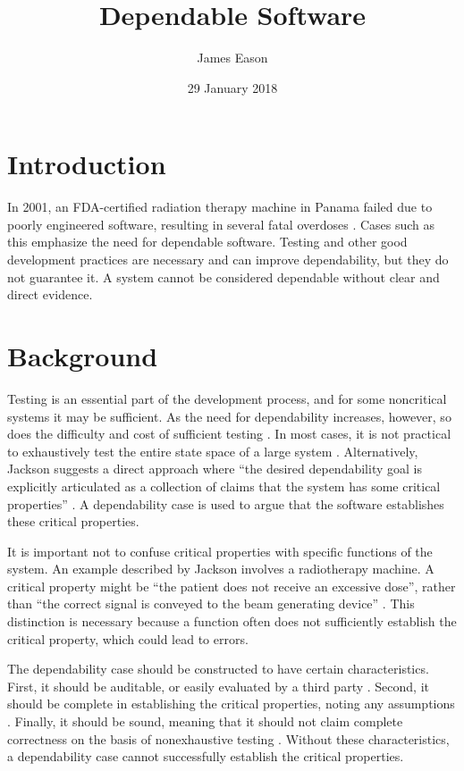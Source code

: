 \documentclass[11pt]{article}
\title{Dependable Software}
\author{James Eason}
\date{29 January 2018}
\begin{document}
\maketitle

\thispagestyle{empty}

\begin{doublespace}
  \section{Introduction}

In 2001, an FDA-certified radiation therapy machine in Panama failed due to poorly engineered software, resulting in several fatal overdoses \cite{jackson2009}. Cases such as this emphasize the need for dependable software. Testing and other good development practices are necessary and can improve dependability, but they do not guarantee it. A system cannot be considered dependable without clear and direct evidence.

  \section{Background}

Testing is an essential part of the development process, and for some noncritical systems it may be sufficient. As the need for dependability increases, however, so does the difficulty and cost of sufficient testing \cite{jackson2009}. In most cases, it is not practical to exhaustively test the entire state space of a large system \cite{jackson2009}. Alternatively, Jackson suggests a direct approach where ``the desired dependability goal is explicitly articulated as a collection of claims that the system has some critical properties'' \cite{jackson2009}. A dependability case is used to argue that the software establishes these critical properties.

It is important not to confuse critical properties with specific functions of the system. An example described by Jackson involves a radiotherapy machine. A critical property might be ``the patient does not receive an excessive dose'', rather than ``the correct signal is conveyed to the beam generating device'' \cite{jackson2009}. This distinction is necessary because a function often does not sufficiently establish the critical property, which could lead to errors.

The dependability case should be constructed to have certain characteristics. First, it should be auditable, or easily evaluated by a third party \cite{jackson2009}. Second, it should be complete in establishing the critical properties, noting any assumptions \cite{jackson2009}. Finally, it should be sound, meaning that it should not claim complete correctness on the basis of nonexhaustive testing \cite{jackson2009}. Without these characteristics, a dependability case cannot successfully establish the critical properties.


\end{doublespace}
\end{document}

